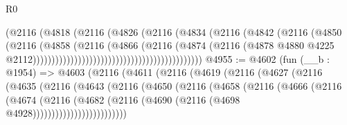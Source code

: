 \begin{lexlean}{R0}
\begin{coremodule}
                                                          (@2116
                                                            (@4818
                                                              (@2116
                                                                (@4826
                                                                  (@2116
                                                                    (@4834
                                                                      (@2116
                                                                        (@4842
                                                                          (@2116
                                                                            (@4850
                                                                              (@2116
                                                                                (@4858
                                                                                  (@2116
                                                                                    (@4866
                                                                                      (@2116
                                                                                        (@4874
                                                                                          (@2116
                                                                                            (@4878
                                                                                              @4880
                                                                                              @4225
                                                                                              @2112)))))))))))))))))))))))))))))))))))))))))))))
@4955 := @4602
    (fun (__b : @1954) =>
    @4603
      (@2116
        (@4611
          (@2116
            (@4619
              (@2116
                (@4627
                  (@2116
                    (@4635
                      (@2116
                        (@4643
                          (@2116
                            (@4650
                              (@2116
                                (@4658
                                  (@2116
                                    (@4666
                                      (@2116
                                        (@4674
                                          (@2116
                                            (@4682
                                              (@2116
                                                (@4690 (@2116 (@4698 @4928)))))))))))))))))))))))))

\end{coremodule}
\end{lexlean}

